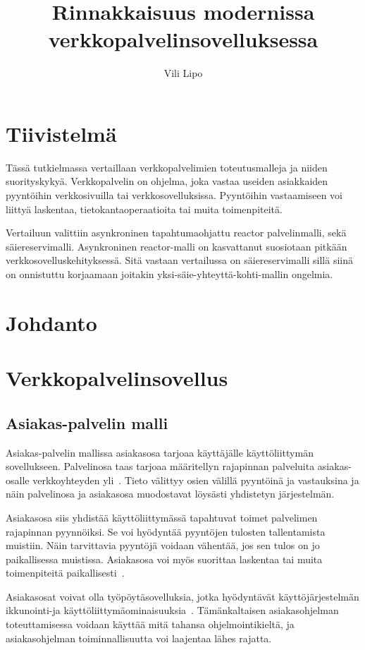 \documentclass[12pt]{article}
\title{Rinnakkaisuus modernissa verkkopalvelinsovelluksessa}
\author{Vili Lipo}
\begin{document}
\maketitle
\newpage
\tableofcontents
\newpage
\section*{Tiivistelmä}
Tässä tutkielmassa vertaillaan verkkopalvelimien toteutusmalleja
ja niiden suorityskykyä. Verkkopalvelin on ohjelma, joka vastaa useiden asiakkaiden pyyntöihin
verkkosivuilla tai verkkosovelluksissa. Pyyntöihin vastaamiseen
voi liittyä laskentaa, tietokantaoperaatioita tai muita toimenpiteitä.

Vertailuun valittiin asynkroninen tapahtumaohjattu reactor palvelinmalli, sekä säiereservimalli.
Asynkroninen reactor-malli on kasvattanut suosiotaan pitkään verkkosovelluskehityksessä.
Sitä vastaan vertailussa on säiereservimalli sillä siinä on
onnistuttu korjaamaan joitakin yksi-säie-yhteyttä-kohti-mallin ongelmia.
\section{Johdanto}
\section{Verkkopalvelinsovellus}
\subsection{Asiakas-palvelin malli}
Asiakas-palvelin mallissa
asiakasosa tarjoaa käyttäjälle käyttöliittymän sovellukseen. Palvelinosa taas
tarjoaa määritellyn rajapinnan
palveluita asiakas-osalle verkkoyhteyden yli~\cite{sinha_client-server_1992}.
Tieto välittyy osien välillä pyyntöinä ja vastauksina ja näin palvelinosa ja asiakasosa
muodostavat löysästi yhdistetyn järjestelmän.

Asiakasosa siis yhdistää käyttöliittymässä tapahtuvat toimet palvelimen
rajapinnan pyynnöiksi. Se voi hyödyntää pyyntöjen tulosten tallentamista
muistiin. Näin tarvittavia pyyntöjä voidaan vähentää, jos sen tulos
on jo paikallisessa muistissa. Asiakasosa voi myös suorittaa
laskentaa tai muita toimenpiteitä paikallisesti~\cite{sinha_client-server_1992}.

Asiakasosat voivat olla työpöytäsovelluksia, jotka hyödyntävät käyttöjärjestelmän
ikkunointi-ja käyttöliittymäominaisuuksia~\cite{sinha_client-server_1992}.
Tämänkaltaisen asiakasohjelman toteuttamisessa voidaan käyttää mitä tahansa ohjelmointikieltä,
ja asiakasohjelman toiminnallisuutta voi laajentaa lähes rajatta.
\end{document}
